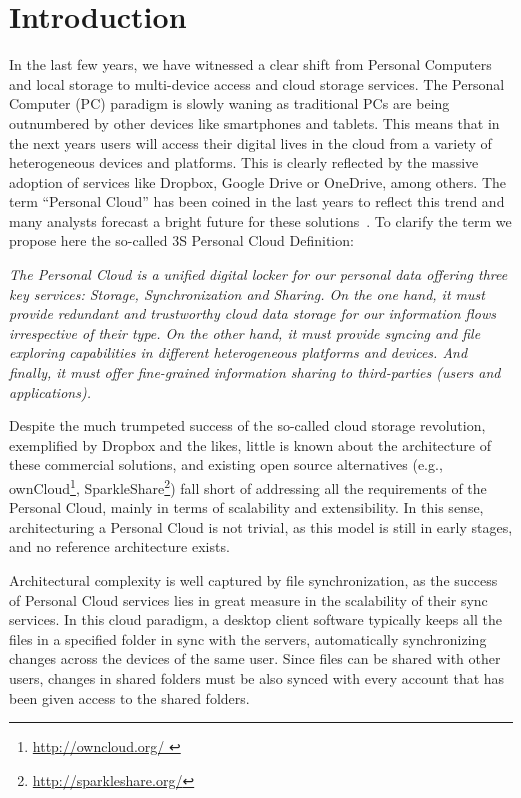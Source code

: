\chapter{Introduction}

In the last few years, we have witnessed a clear shift from Personal Computers and local storage to multi-device access and cloud storage services. The Personal Computer (PC) paradigm is slowly waning as traditional PCs are being outnumbered by other devices like smartphones and tablets. This means that in the next years  users will access their digital lives in the cloud from a variety of heterogeneous devices and platforms. This is clearly reflected by the massive adoption of services like Dropbox, Google Drive or OneDrive, among others.  The term ``Personal Cloud'' has been coined in the last years to reflect this trend and many analysts forecast  a bright future for these solutions~\cite{forrester}\cite{gartner}. To clarify the term we propose here the so-called 3S Personal Cloud Definition:

\textit{The Personal Cloud is a unified digital  locker for our personal data offering three key services: Storage, Synchronization and Sharing.  On the one hand, it must provide redundant and trustworthy cloud data storage for our information flows irrespective of their type. On the other hand, it must provide syncing and file exploring capabilities in different heterogeneous platforms and devices. And finally, it must offer fine-grained information sharing to third-parties (users and applications).}

Despite the much trumpeted success of the so-called cloud storage revolution, exemplified by Dropbox and the 
likes, little is known about the architecture of these commercial solutions, and existing open source alternatives 
(e.g., ownCloud\footnote{\url{ http://owncloud.org/ }}, SparkleShare\footnote{\url{ http://sparkleshare.org/}})
fall short of addressing all the requirements of the Personal Cloud, mainly in terms of scalability and extensibility. 
In this sense, architecturing a Personal Cloud is not trivial, as this model is still in early stages, and no reference architecture exists.

Architectural complexity is well captured by file synchronization, as the success of Personal Cloud services
lies in great measure in the scalability of their sync services. In this cloud paradigm, a desktop client
software typically keeps all the files in a specified folder in sync with the servers, automatically synchronizing changes across the devices of the same user. Since files can be shared with other users, changes in
shared folders must be also synced with every account that has been given access to the shared folders. 

